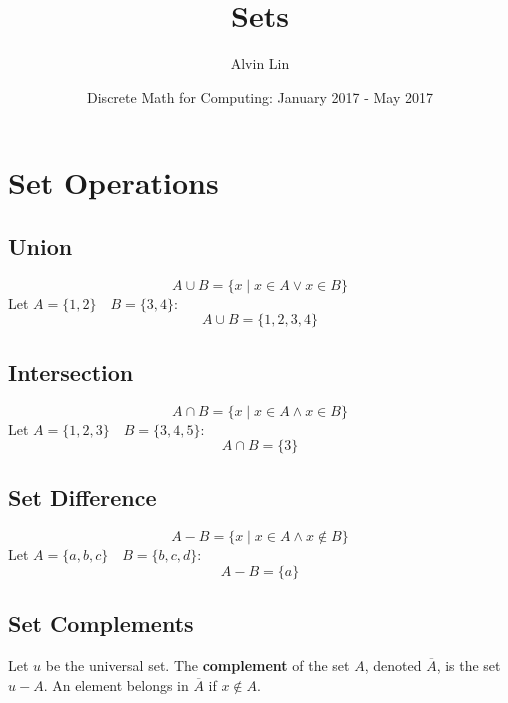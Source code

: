 \documentclass{math}
\title{Sets}
\author{Alvin Lin}
\date{Discrete Math for Computing: January 2017 - May 2017}
\begin{document}
\maketitle

\section*{Set Operations}

\subsection*{Union}
\[ A \cup B = \{x\mid x \in A \vee x \in B\} \]
Let \( A = \{1,2\} \quad B = \{3,4\} \):
\[ A \cup B = \{1,2,3,4\} \]

\subsection*{Intersection}
\[ A \cap B = \{x\mid x \in A \wedge x \in B\} \]
Let \( A = \{1,2,3\} \quad B = \{3,4,5\} \):
\[ A \cap B = \{3\} \]

\subsection*{Set Difference}
\[ A-B = \{x\mid x \in A \wedge x \notin B\} \]
Let \( A = \{a,b,c\} \quad B = \{b,c,d\} \):
\[ A-B = \{a\} \]

\subsection*{Set Complements}
Let \( u \) be the universal set. The \textbf{complement} of the set \( A \),
denoted \( \overline{A} \), is the set \( u-A \). An element belongs in \( \overline{A} \)
if \( x \notin A \).
\end{document}
